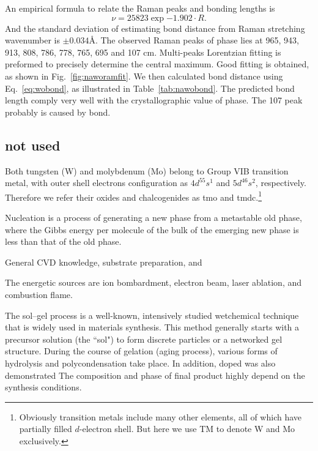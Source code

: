 An empirical formula to relate the Raman peaks and  bonding lengths \cite{Hardcastle1995} is
\begin{equation}\label{eq:wobond}
\nu = 25823 \exp{-1.902\cdot R}.
\end{equation}
And the standard deviation of estimating  bond distance from Raman stretching wavenumber is $\pm0.034$\AA.
The observed Raman peaks of  phase lies at 965, 943, 913, 808, 786, 778, 765, 695 and 107 cm. Multi-peaks Lorentzian fitting is preformed to precisely determine the central maximum. Good fitting is obtained, as shown in Fig.~\ref{fig:naworamfit}. We then calculated  bond distance using Eq.~\ref{eq:wobond}, as illustrated in Table~\ref{tab:nawobond}. The predicted  bond length comply very well with the crystallographic value of  phase.\cite{Triantafyllou1999a} The 107 peak probably is caused by  bond.


\subsection{not used}
Both tungsten (W) and molybdenum (Mo) belong to Group VIB transition metal, with outer shell electrons configuration as $4d^55s^1$ and $5d^46s^2$, respectively. Therefore we refer their oxides and chalcogenides as \gls{tmo} and \gls{tmdc}.\footnote{Obviously transition metals include many other elements, all of which have partially filled $d$-electron shell. But here we use TM to denote W and Mo exclusively.}

Nucleation is a process of generating a new phase from a metastable old phase, where the Gibbs energy per molecule of the bulk of the emerging new phase is less than that of the old phase.

General CVD knowledge, substrate preparation, and\cite{MichealK.Zuraw2003}


The energetic sources are ion bombardment, electron beam, laser ablation, and combustion flame\cite{Rao2011}.

The sol–gel process is a well-known, intensively studied wetchemical technique that is widely used in materials synthesis. This method generally starts with a precursor solution (the ``sol") to form discrete particles or a networked gel structure. During the course of gelation (aging process), various forms of hydrolysis and polycondensation take place.
In addition, doped  was also demonstrated
The composition and phase of final product highly depend on the synthesis conditions.

